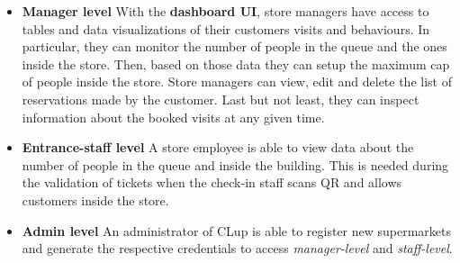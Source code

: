 \begin{itemize}
	\item \textbf{Manager level}\newline
	With the \textbf{dashboard UI}, store managers have access to tables and data visualizations of their customers visits and behaviours. In particular, they can monitor the number of people in the queue and the ones inside the store. Then, based on those data they can setup the maximum cap of people inside the store.\newline
	Store managers can view, edit and delete the list of reservations made by the customer.\newline
	Last but not least, they can inspect information about the booked visits at any given time.

	\item \textbf{Entrance-staff level}\newline
	A store employee is able to view data about the number of people in the queue and inside the building. This is needed during the validation of tickets when the check-in staff scans QR and allows customers inside the store.

    \item \textbf{Admin level}\newline
    An administrator of CLup is able to register new supermarkets and generate the respective credentials to access \textit{manager-level} and \textit{staff-level}.
\end{itemize}


